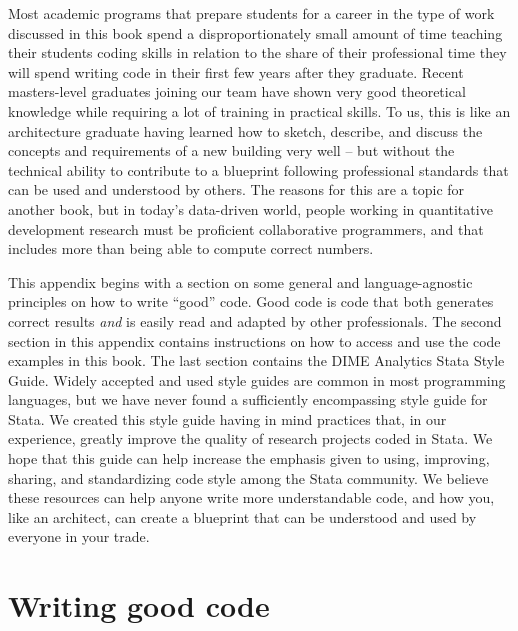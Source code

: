 
\begin{fullwidth}

Most academic programs that prepare students for a career
in the type of work discussed in this book
spend a disproportionately small amount of time 
teaching their students coding skills
in relation to the share of their professional time 
they will spend writing code
in their first few years after they graduate.
Recent masters-level graduates joining our team
have shown very good theoretical knowledge
while requiring a lot of training in practical skills.
To us, this is like an architecture graduate having learned
how to sketch, describe, and discuss
the concepts and requirements of a new building very well --
but without the technical ability
to contribute to a blueprint following professional standards
that can be used and understood by others.
The reasons for this are a topic for another book,
but in today's data-driven world,
people working in quantitative development research 
must be proficient collaborative programmers,
and that includes more than being able to compute correct numbers.

This appendix begins with a section on some general and language-agnostic
principles on how to write ``good'' code. 
Good code is code that both generates correct results \textit{and} 
is easily read and adapted by other professionals.
The second section in this appendix contains instructions
on how to access and use the code examples in this book.
The last section contains the DIME Analytics Stata Style Guide.
Widely accepted and used style guides are common in most programming languages,
but we have never found a sufficiently encompassing style guide for Stata.
We created this style guide having in mind practices that,
in our experience, greatly improve the quality
of research projects coded in Stata.
We hope that this guide can help increase the emphasis
given to using, improving, sharing, and standardizing code style 
among the Stata community.
We believe these resources can help anyone write more understandable code,
and how you, like an architect,
can create a blueprint that can be understood and used 
by everyone in your trade.

\end{fullwidth}


\section{Writing good code}

